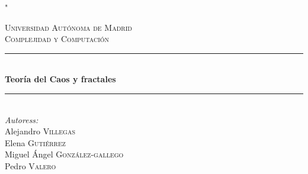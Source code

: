 \newtheorem{theorem}{Teorema}[section]
\newtheorem{lemma}{Lema}[section]
\newtheorem{proposition}{Proposición}[section]
\theoremstyle{definition}
\newtheorem{definition}{Definición}[section]
\newtheorem{example}{Ejemplo}[section]

\renewcommand{\headrulewidth}{0.5pt}

\let\ph\mlplaceholder %
\lstMakeShortInline"

\lstset{
  style              = Matlab-editor,
  basicstyle         = \mlttfamily,
  escapechar         = ",
  mlshowsectionrules = true,
}



\begin{titlepage}

\newcommand{\HRule}{\rule{\linewidth}{0.5mm}} %

\center %


\textsc{\LARGE Universidad Autónoma de Madrid}\\[1.5cm] %
\textsc{\Large Complejidad y Computación}\\[0.5cm] %



\HRule \\[0.4cm]
{ \huge \bfseries Teoría del Caos y fractales}\\[0.4cm] %
\HRule \\[1cm]




\Large \emph{Autoress:}\\
Alejandro \textsc{Villegas}\\ %
Elena \textsc{Gutiérrez}\\ %
Miguel Ángel \textsc{González-gallego} \\
Pedro \textsc{Valero}\\[1cm] %


\end{titlepage}

